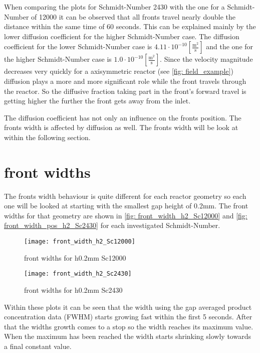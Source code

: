 \documentclass[../thesis.tex]{subfiles}
\begin{document}
When comparing the plots for Schmidt-Number 2430 with the one for a Schmidt-Number of 12000 it can be observed that all fronts travel nearly double the distance within the same time of 60 seconds. This can be explained mainly by the lower diffusion coefficient for the higher Schmidt-Number case. The diffusion coefficient for the lower Schmidt-Number case is $4 \text{.}11 \cdot 10^{-10} \left[ \frac{\mathrm{m^2}}{\mathrm{s}} \right]$ and the one for the higher Schmidt-Number case is $1\text{.}0 \cdot 10^{-10} \left[ \frac{\mathrm{m^2}}{\mathrm{s}} \right]$. Since the velocity magnitude decreases very quickly for a axisymmetric reactor (see \autoref{fig: field_example}) diffusion plays a more and more significant role while the front travels through the reactor. So the diffusive fraction taking part in the front's forward travel is getting higher the further the front gets away from the inlet. 

The diffusion coefficient has not only an influence on the fronts position. The fronts width is affected by diffusion as well. The fronts width will be look at within the following section.

\section{front widths}

The fronts width behaviour is quite different for each reactor geometry so each one will be looked at starting with the smallest gap height of 0.2mm. The front widths for that geometry are shown in \autoref{fig: front_width_h2_Sc12000} and \autoref{fig: front_width_pos_h2_Sc2430} for each investigated Schmidt-Number.

\begin{figure}[htbp]
	\centering
	\texttt{[image: front\_width\_h2\_Sc12000]}
	\caption{front widths for h0.2mm Sc12000\label{fig: front_width_h2_Sc12000}}\bigskip
	\texttt{[image: front\_width\_h2\_Sc2430]}
	\caption{front widths for h0.2mm Sc2430\label{fig: front_width_pos_h2_Sc2430}}
\end{figure}

Within these plots it can be seen that the width using the gap averaged product concentration data (FWHM) starts growing fast within the first 5 seconds. After that the widths growth comes to a stop so the width reaches its maximum value. When the maximum has been reached the width starts shrinking slowly towards a final constant value.
\end{document}
